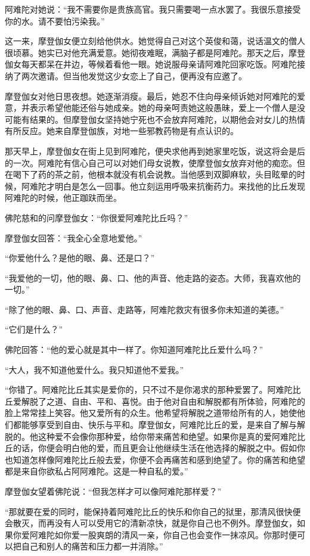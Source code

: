 \documentclass[12pt,twoside,openany]{book}
\begin{document}
阿难陀对她说：“我不需要你是贵族高官。我只需要喝一点水罢了。我很乐意接受你的水。请不要怕污染我。”

这一来，摩登伽女便立刻给他供水。她觉得自己对这个英俊和蔼，说话温文的僧人很顷慕。她实已对他充满爱意。她彻夜难眠，满脑子都是阿难陀。那天之后，摩登伽女每天都呆在井边，等候着看他一眼。她说服母亲请阿难陀回家吃饭。阿难陀接纳了两次邀请。但当他发觉这少女恋上了自己，便再没有应邀了。

摩登伽女对他日思夜想。她逐渐消瘦。最后，她忍不住向母亲倾诉她对阿难陀的爱意，并表示希望他能还俗与她成亲。她的母亲呵责她这般愚昧，爱上一个僧人是没可能有结果的。但摩登伽女坚持她宁死也不会放弃阿难陀，以期他会对女儿的热情有所反应。她来自摩登伽族，对地一些邪教药物是有点认识的。

那天早上，摩登伽女在街上见到阿难陀，便央求他再到她家里吃饭，说这将会是后的一次。阿难陀有信心自己可以对她们母女说教，使摩登伽女放弃对他的痴恋。但在喝下了药的茶之前，他根本就没有机会说教。当他感到双脚麻软，头目眩晕的时候，阿难陀才明白是怎么一回事。他立刻运用呼吸来抗衡药力。来找他的比丘发现阿难陀的时候，他正跏趺而坐。

佛陀慈和的问摩登伽女：“你很爱阿难陀比丘吗？”

摩登伽女回答：“我全心全意地爱他。”

“你爱他什么？是他的眼、鼻、还是口？”

“我爱他的一切，他的眼、鼻、口、他的声音、他走路的姿态。大师，我喜欢他的一切。”

“除了他的眼、鼻、口、声音、走路等，阿难陀救灾有很多你未知道的美德。”

“它们是什么？”

佛陀回答：“他的爱心就是其中一样了。你知道阿难陀比丘爱什么吗？”

“大人，我不知道他爱什么。我只知道他不爱我。”

“你错了。阿难陀比丘其实是爱你的，只不过不是你渴求的那种爱罢了。阿难陀比丘爱解脱了之道、自由、平和、喜悦。由于他对自由和解脱都有所体验，阿难陀的脸上常常挂上笑容。他又爱所有的众生。他希望将解脱之道带给所有的人，她使他们都能够享受到自由、快乐与平和。摩登伽女，阿难陀比丘的爱，是来自了解与解脱的。他这种爱不会像你那种爱，给你带来痛苦和绝望。如果你是真的爱阿难陀比丘的话，你便会明白他的爱，而且更会让他继续生活在他选择的解脱之中。假如你也知道怎样像阿难陀比丘般去爱，你便不会再痛苦和感到绝望了。你的痛苦和绝望都是来自你欲私占阿阿难陀。这是一种自私的爱。”

摩登伽女望着佛陀说：“但我怎样才可以像阿难陀那样爱？”

“那就要在爱的同时，能保持着阿难陀比丘的快乐和你自己的狱里，那清风很快便会散灭，而再没有人可以受用它的清新凉快，就是你自己也不例外。摩登伽女，如果你爱阿难陀如你爱一股爽朗的清风一亲，你自己也会变作一抹凉风。你那时便可以把自己和别人的痛苦和压力都一并消除。”
\end{document}
